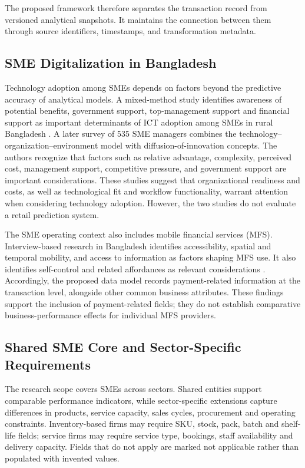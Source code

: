 \documentclass[a4paper,11pt,oneside]{book}
\theoremstyle{plain}
\theoremstyle{definition}
\theoremstyle{remark}
\begin{document}
The proposed framework therefore separates the transaction record from versioned analytical snapshots. It maintains the connection between them through source identifiers, timestamps, and transformation metadata.


\subsection{SME Digitalization in Bangladesh}

Technology adoption among SMEs depends on factors beyond the predictive
accuracy of analytical models. A mixed-method study identifies awareness of
potential benefits, government support, top-management support and financial
support as important determinants of ICT adoption among SMEs in rural Bangladesh \cite{hoque2016ict}. A later survey of 535 SME managers combines the technology--organization--environment model with diffusion-of-innovation concepts. The authors \cite{shahadat2023digital} recognize that factors such as relative advantage, complexity, perceived cost, management support, competitive pressure, and government support are important considerations. These studies suggest that organizational readiness and costs, as well as technological fit and workflow functionality, warrant attention when considering technology adoption. However, the two studies do not evaluate a retail prediction system.

The SME operating context also includes mobile financial services (MFS).
Interview-based research in Bangladesh identifies accessibility, spatial
and temporal mobility, and access to information as factors shaping MFS use.
It also identifies self-control and related affordances as relevant
considerations \cite{hazra2021mfs}. Accordingly, the proposed data model
records payment-related information at the transaction level, alongside
other common business attributes. These findings support the inclusion of
payment-related fields; they do not establish comparative business-performance
effects for individual MFS providers.



\subsection{Shared SME Core and Sector-Specific Requirements}

The research scope covers SMEs across sectors. Shared entities
support comparable performance indicators, while sector-specific extensions
capture differences in products, service capacity, sales cycles, procurement
and operating constraints. Inventory-based firms may require SKU, stock, pack,
batch and shelf-life fields; service firms may require service type, bookings,
staff availability and delivery capacity. Fields that do not apply are marked
not applicable rather than populated with invented values.
\end{document}
